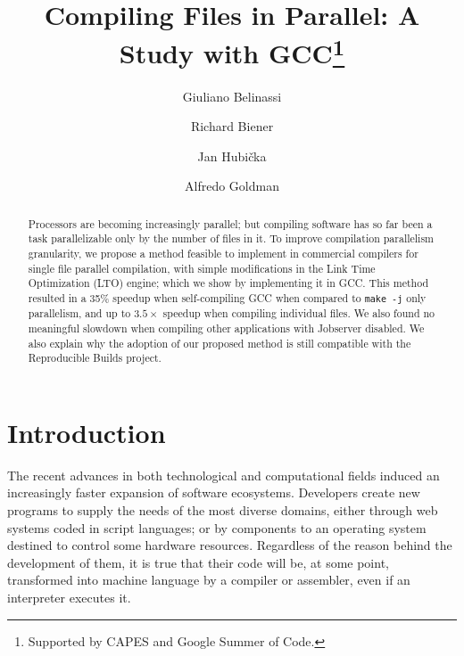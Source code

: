 \documentclass[runningheads]{llncs}
\begin{document}


%
\title{Compiling Files in Parallel: A Study with GCC\thanks{Supported by CAPES and Google Summer of Code.}}
%
%
\author{Giuliano Belinassi \and Richard Biener \and Jan Hubi\v cka  \and Alfredo Goldman}
%
%

%
\maketitle              %
%
\begin{abstract}

Processors are becoming increasingly parallel; but compiling software has so
far been a task parallelizable only by the number of files in it. To improve
compilation parallelism granularity, we propose a method feasible to implement
in commercial compilers for single file parallel compilation, with simple
modifications in the Link Time Optimization (LTO) engine; which we show by
implementing it in GCC. This method resulted in a 35\% speedup when
self-compiling GCC when compared to \texttt{make -j} only parallelism, and
up to $3.5\times$ speedup when compiling individual files. We also found no
meaningful slowdown when compiling other applications with Jobserver disabled.
We also explain why the adoption of our proposed method is still compatible
with the Reproducible Builds project.

\end{abstract}
%
%
%
\section{Introduction}

The recent advances in both technological and computational fields induced an
increasingly faster expansion of software ecosystems. Developers create new
programs to supply the needs of the most diverse domains, either through web
systems coded in script languages; or by components to an operating system
destined to control some hardware resources. Regardless of the reason behind
the development of them, it is true that their code will be, at some
point, transformed into machine language by a compiler or assembler, even if an
interpreter executes it.
\end{document}
